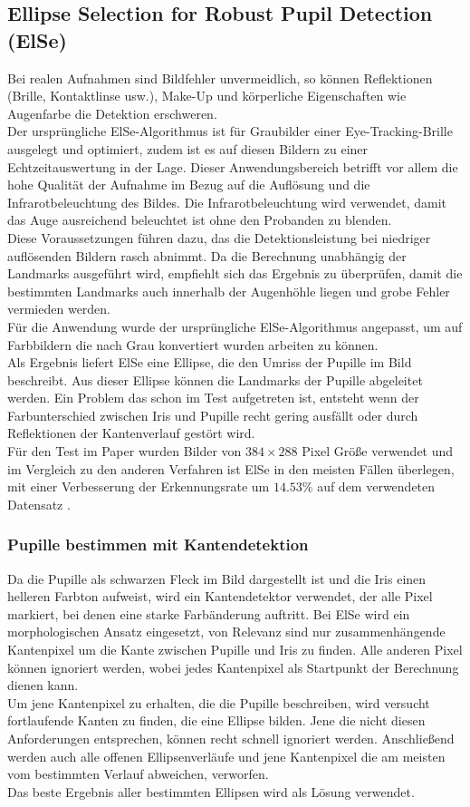 \subsection{Ellipse Selection for Robust Pupil Detection (ElSe)}
Bei realen Aufnahmen sind Bildfehler unvermeidlich, so können Reflektionen (Brille, Kontaktlinse usw.), Make-Up und körperliche Eigenschaften wie Augenfarbe die Detektion erschweren.\\
Der ursprüngliche ElSe-Algorithmus ist für Graubilder einer Eye-Tracking-Brille ausgelegt und optimiert, zudem ist es auf diesen Bildern zu einer Echtzeitauswertung in der Lage. Dieser Anwendungsbereich betrifft vor allem die hohe Qualität der Aufnahme im Bezug auf die Auflösung und die Infrarotbeleuchtung des Bildes. Die Infrarotbeleuchtung wird verwendet, damit das Auge ausreichend beleuchtet ist ohne den Probanden zu blenden.\\
Diese Voraussetzungen führen dazu, das die Detektionsleistung bei niedriger auflösenden Bildern rasch abnimmt. Da die Berechnung unabhängig der Landmarks ausgeführt wird, empfiehlt sich das Ergebnis zu überprüfen, damit die bestimmten Landmarks auch innerhalb der Augenhöhle liegen und grobe Fehler vermieden werden.\\
Für die Anwendung wurde der ursprüngliche ElSe-Algorithmus angepasst, um auf Farbbildern die nach Grau konvertiert wurden arbeiten zu können.\\
Als Ergebnis liefert ElSe eine Ellipse, die den Umriss der Pupille im Bild beschreibt. Aus dieser Ellipse können die Landmarks der Pupille abgeleitet werden.
Ein Problem das schon im Test aufgetreten ist, entsteht wenn der Farbunterschied zwischen Iris und Pupille recht gering ausfällt oder durch Reflektionen der Kantenverlauf gestört wird.\\
Für den Test im Paper wurden Bilder von $384\times 288$ Pixel Größe verwendet und im Vergleich zu den anderen Verfahren ist ElSe in den meisten Fällen überlegen, mit einer Verbesserung der Erkennungsrate um $14.53\%$ auf dem verwendeten Datensatz \cite{ElSe}.
\subsubsection{Pupille bestimmen mit Kantendetektion}
Da die Pupille als schwarzen Fleck im Bild dargestellt ist und die Iris einen helleren Farbton aufweist, wird ein Kantendetektor verwendet, der alle Pixel markiert, bei denen eine starke Farbänderung auftritt. Bei ElSe wird ein morphologischen Ansatz eingesetzt, von Relevanz sind nur zusammenhängende Kantenpixel um die Kante zwischen Pupille und Iris zu finden. Alle anderen Pixel können ignoriert werden, wobei jedes Kantenpixel als Startpunkt der Berechnung dienen kann.\\
Um jene Kantenpixel zu erhalten, die die Pupille beschreiben, wird versucht fortlaufende Kanten zu finden, die eine Ellipse bilden. Jene die nicht diesen Anforderungen entsprechen, können recht schnell ignoriert werden. Anschließend werden auch alle offenen Ellipsenverläufe und jene Kantenpixel die am meisten vom bestimmten Verlauf abweichen, verworfen.\\
Das beste Ergebnis aller bestimmten Ellipsen wird als Lösung verwendet.
